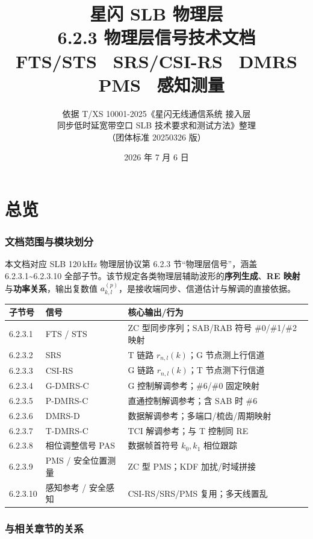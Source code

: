 \documentclass[11pt,a4paper]{ctexart}
\title{%
  \textbf{星闪 SLB 物理层}\\[0.4em]
  \Large 6.2.3 物理层信号技术文档\\[0.3em]
  \large FTS/STS \textbullet\ SRS/CSI-RS \textbullet\ DMRS \textbullet\ PMS \textbullet\ 感知测量
}
\author{依据 T/XS 10001-2025《星闪无线通信系统 接入层\\
同步低时延宽带空口 SLB 技术要求和测试方法》整理\\
（团体标准 20250326 版）}
\date{2026 年 7 月 6 日}
\begin{document}
\maketitle
\tableofcontents
\newpage

\part{总览}

\section{文档范围与模块划分}

本文档对应 SLB 120\,kHz 物理层协议第 6.2.3 节``物理层信号''，涵盖 6.2.3.1\textasciitilde 6.2.3.10 全部子节。该节规定各类物理层辅助波形的\textbf{序列生成}、\textbf{RE 映射}与\textbf{功率关系}，输出复数值 $a_{k,l}^{(p)}$，是接收端同步、信道估计与解调的直接依据。

\begin{table}[h]
\centering
\small
\begin{tabular}{L{2.2cm}L{4.2cm}L{6.1cm}}
\toprule
\textbf{子节号} & \textbf{信号} & \textbf{核心输出/行为} \\
.3.1 & FTS / STS & ZC 型同步序列；SAB/RAB 符号 \#0/\#1/\#2 映射 \\
6.2.3.2 & SRS & T 链路 $r_{n,l}(k)$；G 节点测上行信道 \\
6.2.3.3 & CSI-RS & G 链路 $r_{n,l}(k)$；T 节点测下行信道 \\
6.2.3.4 & G-DMRS-C & G 控制解调参考；\#6/\#0 固定映射 \\
6.2.3.5 & P-DMRS-C & 直通控制解调参考；含 SAB 时 \#6 \\
6.2.3.6 & DMRS-D & 数据解调参考；多端口/梳齿/周期映射 \\
6.2.3.7 & T-DMRS-C & TCI 解调参考；与 T 控制同 RE \\
6.2.3.8 & 相位调整信号 PAS & 数据帧首符号 $k_0,k_1$ 相位跟踪 \\
6.2.3.9 & PMS / 安全位置测量 & ZC 型 PMS；KDF 加扰/时域拼接 \\
6.2.3.10 & 感知参考 / 安全感知 & CSI-RS/SRS/PMS 复用；多天线置乱 \\
\bottomrule
\end{tabular}
\end{table}

\section{与相关章节的关系}
\end{document}
